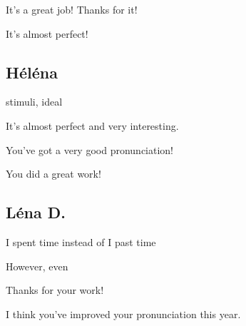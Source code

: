 \documentclass[12pt,oneside]{report}
\begin{document}
\begin{spacing}{1.2}
\color{blue}
It's a great job! Thanks for it!

It's almost perfect!
\color{black}

\subsection*{Héléna}

stimuli, ideal

\color{blue}
It's almost perfect and very interesting.

You've got a very good pronunciation!

You did a great work!
\color{black}

\subsection*{Léna D.}

\color{blue}
\og I spent time\fg{} instead of \og I past time \fg{} 
\color{black}

However, even

\color{blue}
Thanks for your work!

I think you've improved your pronunciation this year.
\color{black}



\end{spacing}
\end{document}
